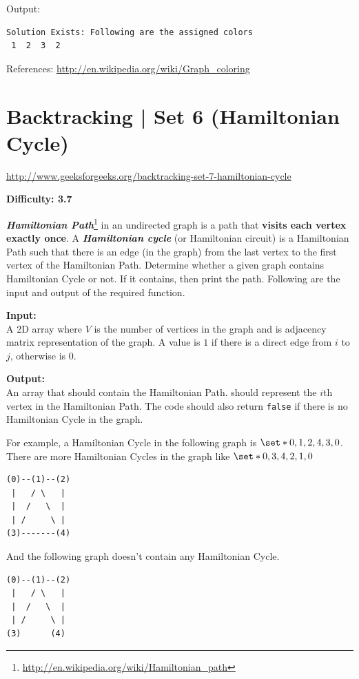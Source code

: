 Output:
\begin{lstlisting}[style=rayio]
Solution Exists: Following are the assigned colors
 1  2  3  2
\end{lstlisting}
References:
\url{http://en.wikipedia.org/wiki/Graph\_coloring}


\section{Backtracking | Set 6 (Hamiltonian Cycle)
  \label{secGFGBktrckSet6HamiltonianCycle}}

\url{http://www.geeksforgeeks.org/backtracking-set-7-hamiltonian-cycle}

\textbf{Difficulty: 3.7}

\textbf{\emph{Hamiltonian
    Path}}\footnote{\url{http://en.wikipedia.org/wiki/Hamiltonian\_path}}
in an undirected graph is a path that \textbf{visits each vertex exactly
  once}. A \textbf{\emph{Hamiltonian cycle}} (or Hamiltonian circuit) is a
Hamiltonian Path such that there is an edge (in the graph) from the last
vertex to the first vertex of the Hamiltonian Path. Determine whether a
given graph contains Hamiltonian Cycle or not. If it contains, then print
the path. Following are the input and output of the required function.

\noindent{}\textbf{Input:}\\
A 2D array  where $V$ is the number of vertices in the
graph and  is adjacency matrix representation of the graph.
A value  is $1$ if there is a direct edge from $i$ to $j$,
otherwise  is $0$.

\noindent{}\textbf{Output:}\\ An array  that should contain the
Hamiltonian Path.   should represent the $i$th vertex in the
Hamiltonian Path. The code should also return \texttt{false} if there is no
Hamiltonian Cycle in the graph.

For example, a Hamiltonian Cycle in the following graph is
$\set*{0,1,2,4,3,0}$. There are more Hamiltonian Cycles in the graph like
$\set*{0,3,4,2,1,0}$
\begin{lstlisting}[style=raygeneric]
(0)--(1)--(2)
 |   / \   |
 |  /   \  | 
 | /     \ |
(3)-------(4)
\end{lstlisting}
And the following graph doesn't contain any Hamiltonian Cycle.
\begin{lstlisting}[style=raygeneric]
(0)--(1)--(2)
 |   / \   |
 |  /   \  | 
 | /     \ |
(3)      (4) 
\end{lstlisting}

